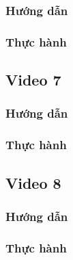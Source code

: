 \documentclass{article}
\begin{document}
\subsubsection{Hướng dẫn}

\subsubsection{Thực hành}




\subsection{Video 7}
\subsubsection{Hướng dẫn}

\subsubsection{Thực hành}




\subsection{Video 8}
\subsubsection{Hướng dẫn}

\subsubsection{Thực hành}








\end{document}

